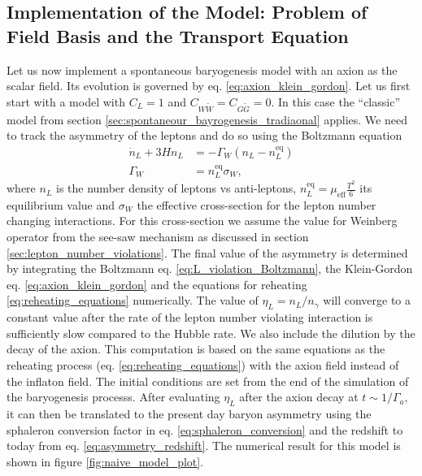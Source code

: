 \documentclass[13pt,a4paper,titlepage]{article}
\begin{document}
\subsection{Implementation of the Model: Problem of Field Basis and the Transport Equation}
\label{sec:model}

Let us now implement a spontaneous baryogenesis model with an axion as the scalar field.
Its evolution is governed by eq. \eqref{eq:axion_klein_gordon}.
Let us first start with a model with $C_L = 1$ and $C_{W \tilde{W}} = C_{G \tilde{G}} = 0$.
In this case the ``classic'' model from section \ref{sec:spontaneour_bayrogenesis_tradiaonal} applies.
We need to track the asymmetry of the leptons and do so using the Boltzmann equation \cite[eq. 7]{Axion_leptogenesis_Kusenko_2015}
\begin{align}
    \label{eq:L_violation_Boltzmann}
    \dot{n}_L + 3 H n_L &= - \Gamma_W (n_L - n_L^\mathrm{eq}) \\
    \Gamma_W &= n^\mathrm{eq}_L \sigma_W,
\end{align}
where $n_L$ is the number density of leptons vs anti-leptons, $n_L^\mathrm{eq} = \mu_\mathrm{eff} \frac{T^2}{6}$ its equilibrium value and $\sigma_W$ the effective cross-section for the lepton number
changing interactions. For this cross-section we assume the value for Weinberg operator from the see-saw mechanism as discussed in section \ref{sec:lepton_number_violations}.
The final value of the asymmetry is determined by integrating the Boltzmann eq. \eqref{eq:L_violation_Boltzmann}, the Klein-Gordon eq. \eqref{eq:axion_klein_gordon} and the
equations for reheating \eqref{eq:reheating_equations} numerically.
The value of $\eta_L = n_L / n_\gamma$ will converge to
a constant value after the rate of the lepton number violating interaction is sufficiently slow compared to the Hubble rate.
We also include the dilution by the decay of the axion. This computation is based on the same equations
as the reheating process (eq. \eqref{eq:reheating_equations}) with the axion field instead of the
inflaton field. The initial conditions are set from the end of the simulation of the baryogenesis
processs.
After evaluating $\eta_L$ after the axion decay at $t \sim 1/\Gamma_a$, it can then be translated to
the present day baryon asymmetry using the sphaleron conversion factor in eq. \eqref{eq:sphaleron_conversion} and the redshift to today from eq. \eqref{eq:asymmetry_redshift}.
The numerical result for this model is shown in figure \ref{fig:naive_model_plot}.
\end{document}
